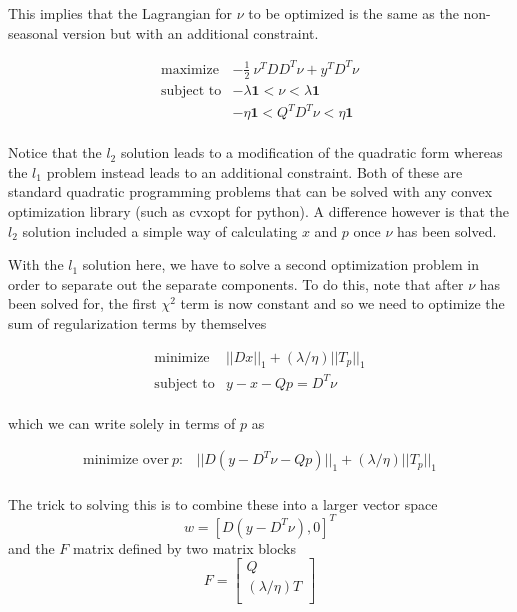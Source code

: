 \documentclass{article}
\begin{document}
This implies that the Lagrangian for $\nu$ to be optimized is the same as the non-seasonal
version but with an additional constraint.

\begin{eqnarray}
\mbox{maximize} & - \frac{1}{2} ~ \nu^T D D^T \nu + y^T D^T \nu \\
\mbox{subject to} & - \lambda \mathbf{1} < \nu < \lambda \mathbf{1} \\
& - \eta \mathbf{1} < Q^T D^T \nu < \eta \mathbf{1} \\
\end{eqnarray}

Notice that the $l_2$ solution leads to a modification of the quadratic form whereas the
$l_1$ problem instead leads to an additional constraint. Both of these are standard quadratic
programming problems that can be solved with any convex optimization library (such as cvxopt for python).
A difference however is that the $l_2$ solution included a simple way of calculating $x$ and $p$ once
$\nu$ has been solved.

With the $l_1$ solution here, we have to solve a second optimization problem
in order to separate out the separate components. To do this, note that after $\nu$ has been solved for,
the first $\chi^2$ term is now constant
and so we need to optimize the sum of regularization terms by themselves

\begin{eqnarray}
\mbox{minimize} & ||D x||_1 + (\lambda / \eta) ||T_p||_1 \\
\mbox{subject to} & y - x - Qp = D^T \nu \\
\end{eqnarray}

which we can write solely in terms of $p$ as

\begin{eqnarray}
\mbox{minimize over} ~p : & ||D (y - D^T \nu - Q p)||_1 + (\lambda / \eta) ||T_p||_1 \\
\end{eqnarray}

The trick to solving this is to combine these into a larger vector space
\[
w = [D (y - D^T \nu), 0]^T
\]
and the $F$ matrix defined by two matrix blocks
\begin{equation}
F=\left[
\begin{array}{c}
Q  \\
\hline
(\lambda/\eta) T \\
\end{array}\right]
\end{equation}
\end{document}
